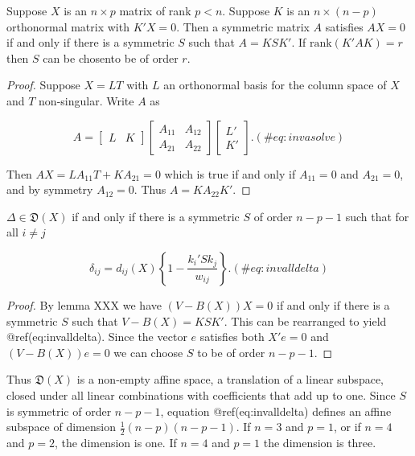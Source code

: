 \documentclass[
  12pt,
  letterpaper,
  DIV=11,
  numbers=noendperiod]{scrreprt}
\theoremstyle{remark}
\begin{document}
\label{syminv}
Suppose \(X\) is an \(n\times p\) matrix of rank \(p<n\). Suppose \(K\)
is an \(n\times(n-p)\) orthonormal matrix with \(K'X=0\). Then a
symmetric matrix \(A\) satisfies \(AX=0\) if and only if there is a
symmetric \(S\) such that \(A=KSK'\). If \(\text{rank}(K'AK)=r\) then
\(S\) can be chosento be of order \(r\).

\begin{proof}
Suppose \(X=LT\) with \(L\) an orthonormal basis for the column space of
\(X\) and \(T\) non-singular. Write \(A\) as

\begin{equation}
A=\begin{bmatrix}L&K\end{bmatrix}
\begin{bmatrix}
A_{11}&A_{12}\\A_{21}&A_{22}
\end{bmatrix}
\begin{bmatrix}L'\\K'\end{bmatrix}.
(\#eq:invasolve)
\end{equation}

Then \(AX=LA_{11}T+KA_{21}=0\) which is true if and only if \(A_{11}=0\)
and \(A_{21}=0\), and by symmetry \(A_{12}=0\). Thus \(A=KA_{22}K'\).
\end{proof}

\label{keyresult}
\(\Delta\in\mathfrak{D}(X)\) if and only if there is a symmetric \(S\)
of order \(n-p-1\) such that for all \(i\not= j\)

\begin{equation}
\delta_{ij}=d_{ij}(X)\left\{1-\frac{k_i'Sk_j^{\ }}{w_{ij}}\right\}.
(\#eq:invalldelta)
\end{equation}

\begin{proof}
By lemma XXX we have \((V-B(X))X=0\) if and only if there is a symmetric
\(S\) such that \(V-B(X)=KSK'\). This can be rearranged to yield
@ref(eq:invalldelta). Since the vector \(e\) satisfies both \(X'e=0\)
and \((V-B(X))e=0\) we can choose \(S\) to be of order \(n-p-1\).
\end{proof}

Thus \(\mathfrak{D}(X)\) is a non-empty affine space, a translation of a
linear subspace, closed under all linear combinations with coefficients
that add up to one. Since \(S\) is symmetric of order \(n-p-1\),
equation @ref(eq:invalldelta) defines an affine subspace of dimension
\(\frac12(n-p)(n-p-1)\). If \(n=3\) and \(p=1\), or if \(n=4\) and
\(p=2\), the dimension is one. If \(n=4\) and \(p=1\) the dimension is
three.
\end{document}
